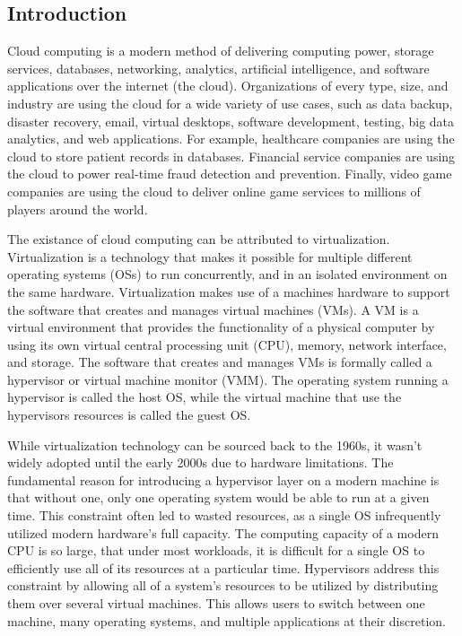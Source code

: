 \documentclass{report}
\begin{document}
\begin{spacing}{1.5}


\newpage
\chapter{Introduction}


{\large
Cloud computing is a modern method of delivering computing power, storage services, databases, networking, analytics, artificial intelligence, and software applications over the internet (the cloud). Organizations of every type, size, and industry are using the cloud for a wide variety of use cases, such as data backup, disaster recovery, email, virtual desktops, software development, testing, big data analytics, and web applications. For example, healthcare companies are using the cloud to store patient records in databases. Financial service companies are using the cloud to power real-time fraud detection and prevention. Finally, video game companies are using the cloud to deliver online game services to millions of players around the world.
\newline
}

{\large
The existance of cloud computing can be attributed to virtualization. Virtualization is a technology that makes it possible for multiple different operating systems (OSs) to run concurrently, and in an isolated environment on the same hardware. Virtualization makes use of a machines hardware to support the software that creates and manages virtual machines (VMs). A VM is a virtual environment that provides the functionality of a physical computer by using its own virtual central processing unit (CPU), memory, network interface, and storage. The software that creates and manages VMs is formally called a hypervisor or virtual machine monitor (VMM). The operating system running a hypervisor is called the host OS, while the virtual machine that use the hypervisors resources is called the guest OS.
\newline
}

{\large
While virtualization technology can be sourced back to the 1960s, it wasn’t widely adopted until the early 2000s due to hardware limitations. The fundamental reason for introducing a hypervisor layer on a modern machine is that without one, only one operating system would be able to run at a given time. This constraint often led to wasted resources, as a single OS infrequently utilized modern hardware’s full capacity. The computing capacity of a modern CPU is so large, that under most workloads, it is difficult for a single OS to efficiently use all of its resources at a particular time. Hypervisors address this constraint by allowing all of a system’s resources to be utilized by distributing them over several virtual machines. This allows users to switch between one machine, many operating systems, and multiple applications at their discretion.
\newline
}


\end{spacing}
\end{document}
